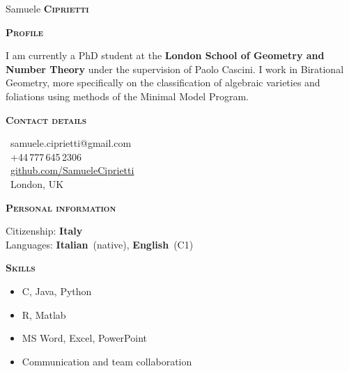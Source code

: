 \documentclass[11pt, a4paper]{article}
\newcommand{\headleft}[1]{\vspace*{3ex}\textsc{\textbf{#1}}\par%
    \vspace*{-1.5ex}\hrulefill\par\vspace*{0.7ex}}
\begin{document}
\setlength{\topskip}{0pt}
\setlength{\parindent}{0pt}
\setlength{\parskip}{0pt}
\setlength{\fboxsep}{0pt}
\pagestyle{empty}
\raggedbottom

\begin{minipage}[t]{0.33\textwidth} %
\colorbox{cvblue}{\begin{minipage}[t][5mm][t]{\textwidth}\null\hfill\null\end{minipage}}

\vspace{-.2ex} %
\colorbox{cvblue!90}{\color{white}  %
\textwidth\relax%
\begin{minipage}[t][293mm][t]{0.82\textwidth}
\raggedright
\vspace*{2.5ex}

\Large Samuele \textbf{\textsc{Ciprietti}} \normalsize 


\vspace*{0.5ex} %

\headleft{Profile}
I am currently a PhD student at the \textbf{London School of Geometry and Number Theory} under the supervision of Paolo Cascini. I work in Birational Geometry, more specifically on the classification of algebraic varieties and foliations using methods of the Minimal Model Program.

\headleft{Contact details}
\small %
\MVAt\ {\small samuele.ciprietti@gmail.com} \\[0.4ex]
\Mobilefone\ +44\,777\,645\,2306 \\[0.5ex]
\Mundus\ \href{https://github.com/SamueleCiprietti}{github.com/SamueleCiprietti} \\[0.1ex]
\Letter\ London, UK
\normalsize

\headleft{Personal information}
Citizenship: \textbf{Italy} \\[0.5ex]
Languages: \textbf{Italian}~(native), \textbf{English}~(C1)

\headleft{Skills}
\begin{itemize}
\item C, Java, Python
\item R, Matlab
\item MS Word, Excel, PowerPoint
\item Communication and team collaboration
\end{itemize} 

\end{minipage}%
\textwidth\relax%
}
\end{minipage}%
\end{document}
